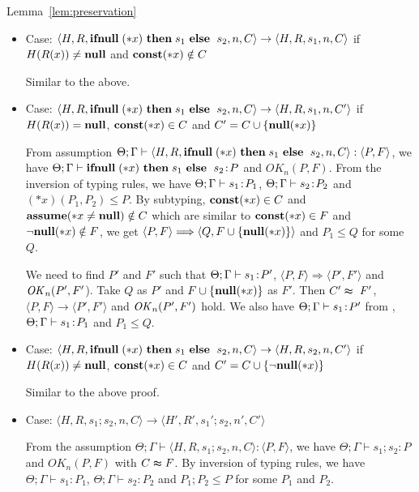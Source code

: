 \begin{pfof}{Lemma~\ref{lem:preservation}}
\begin{itemize}
\item Case: \(\langle H, R, \IFNULL \Sirx \ \THEN s_{1} \ \ELSE
  \ s_{2}, n, C\rangle \rightarrow \langle H, R, s_{1}, n, C \rangle\)
  if \(H(R(x)) \neq \mathbf{null}\) and \(\mathbf{const}(*x) \notin C\)

    Similar to the above.
  
\item Case: \(\langle H, R, \IFNULL \Sirx \ \THEN s_{1} \ \ELSE
  \ s_{2}, n, C\rangle \rightarrow \langle H, R, s_{1}, n, C'
  \rangle\) if \(H(R(x)) = \mathbf{null}\), \(\mathbf{const}(*x) \in C\) and \(C' = C
  \cup \{{\bf null}(*x)\}\)

  From assumption \( \Theta; \Gamma \vdash \langle H, R, \mathbf{ifnull}\;(*x)
  \ \mathbf{then}\; s_{1} \ \mathbf{else}\; \ s_{2}, n, C \rangle : \langle P, F
  \rangle\), we have \(\Theta; \Gamma \vdash \mathbf{ifnull}\;(*x) \ \mathbf{then}\;
  s_{1} \ \mathbf{else}\; \ s_{2} \!:\! P \) and \(OK_n(P, F)\). From the
  inversion of typing rules, we have \(\Theta; \Gamma \vdash s_{1}
  \!:\! P_1\), \(\Theta; \Gamma \vdash s_{2} \!:\! P_2\) and \((*x)(P_1,
  P_2) \le P\). By subtyping, \(\mathbf{const}(*x) \in C\) and \(\mathbf{assume}(*x \ne \mathbf{null})
  \notin C\) which are similar to \(\mathbf{const}(*x) \in F\) and \(\neg{\bf null}(*x)
  \notin F\), we get \(\langle P, F \rangle \Longrightarrow \langle Q,
  F\cup \{{\bf null}(*x)\} \rangle \) and \(P_1 \le Q\) for some \(Q\).
  
  We need to find \(P'\) and \(F'\) such that \(\Theta;\Gamma \vdash
  s_1 \!:\! P'\), \( \langle P, F \rangle \Longrightarrow \langle P',
  F' \rangle\) and \(\mathit{OK}_n(P', F'\)). Take \(Q\) as \(P'\) and \(F\cup
  \{{\bf null}(*x)\}\) as \(F'\). Then \(C' \thickapprox\ F'\), \( \langle P,F
  \rangle \rightarrow \langle P', F' \rangle\) and \(\mathit{OK}_n(P', F')\)
  hold.  We also have \(\Theta; \Gamma \vdash s_1 \!:\! P'\) from
  , \(\Theta; \Gamma \vdash s_1 \!:\! P_1\) and \( P_1 \le
  Q\).

\item Case: \(\langle H, R, \IFNULL \Sirx \ \THEN s_{1} \ \ELSE
    \ s_{2}, n, C\rangle \rightarrow \langle H, R, s_{2}, n, C'
    \rangle\) if \(H(R(x)) \neq \mathbf{null}\), \(\mathbf{const}(*x) \in C\) and \(C'
    = C \cup \{\neg{\bf null}(*x)\}\)

  Similar to the above proof.

\item Case: \(\langle H, R, s_1;s_2, n, C\rangle \rightarrow \langle
  H', R', s_1';s_2, n', C' \rangle \)

  From the assumption \(\Theta; \Gamma \vdash \langle H, R, s_1;s_2,
  n, C \rangle : \langle P, F \rangle\), we have \(\Theta; \Gamma
  \vdash s_1;s_2 : P\) and \(OK_n(P, F)\) with \(C \thickapprox
  F\). By inversion of typing rules, we have \(\Theta; \Gamma \vdash
  s_1: P_1\), \(\Theta; \Gamma \vdash s_2: P_2\) and \(P_1;P_2 \le P\)
  for some \(P_1\) and \(P_2\).


\end{itemize}
\end{pfof}
